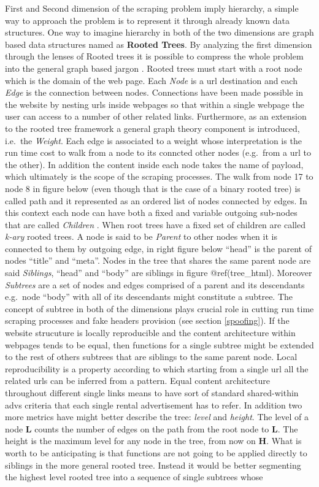 \documentclass[
  12pt,
  a4paper,
  oneside]{book}
\theoremstyle{definition}
\theoremstyle{definition}
\theoremstyle{definition}
\theoremstyle{remark}
\begin{document}
First and Second dimension of the scraping problem imply hierarchy, a simple way to approach the problem is to represent it through already known data structures. One way to imagine hierarchy in both of the two dimensions are graph based data structures named as \textbf{Rooted Trees}. By analyzing the first dimension through the lenses of Rooted trees it is possible to compress the whole problem into the general graph based jargon \citep{Graph_Diestel}. Rooted trees must start with a root node which is the domain of the web page. Each \emph{Node} is a url destination and each \emph{Edge} is the connection between nodes. Connections have been made possible in the website by nesting urls inside webpages so that within a single webpage the user can access to a number of other related links. Furthermore, as an extension to the rooted tree framework a general graph theory component is introduced, i.e.~the \emph{Weight}. Each edge is associated to a weight whose interpretation is the run time cost to walk from a node to its conncted other nodes (e.g.~from a url to the other). In addition the content inside each node takes the name of payload, which ultimately is the scope of the scraping processes. The walk from node 17 to node 8 in figure below (even though that is the case of a binary rooted tree) is called path and it represented as an ordered list of nodes connected by edges. In this context each node can have both a fixed and variable outgoing sub-nodes that are called \emph{Children} . When root trees have a fixed set of children are called \emph{k-ary} rooted trees. A node is said to be \emph{Parent} to other nodes when it is connected to them by outgoing edge, in right figure below ``head'' is the parent of nodes ``title'' and ``meta''. Nodes in the tree that shares the same parent node are said \emph{Siblings}, ``head'' and ``body'' are siblings in figure @ref(tree\_html). Moreover \emph{Subtrees} are a set of nodes and edges comprised of a parent and its descendants e.g.~node ``body'' with all of its descendants might constitute a subtree. The concept of subtree in both of the dimensions plays crucial role in cutting run time scraping processes and fake headers provision (see section \ref{spoofing}). If the website strucuture is locally reproducible and the content architecture within webpages tends to be equal, then functions for a single subtree might be extended to the rest of others subtrees that are siblings to the same parent node. Local reproducibility is a property according to which starting from a single url all the related urls can be inferred from a pattern. Equal content architecture throughout different single links means to have sort of standard shared-within advs criteria that each single rental advertisement has to refer. In addition two more metrics have might better describe the tree: \emph{level} and \emph{height}. The level of a node \(\mathbf{L}\) counts the number of edges on the path from the root node to \(\mathbf{L}\). The height is the maximum level for any node in the tree, from now on \(\mathbf{H}\). What is worth to be anticipating is that functions are not going to be applied directly to siblings in the more general rooted tree. Instead it would be better segmenting the highest level rooted tree into a sequence of single subtrees whose 
\end{document}
